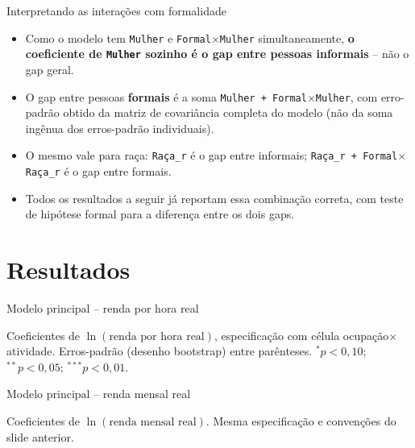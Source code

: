 \documentclass[aspectratio=169]{beamer}
\newcommand{\highlight}[1]{\textcolor{accentblue}{\textbf{#1}}}
\begin{document}
\begin{frame}{Interpretando as intera\c{c}\~oes com formalidade}
  \begin{itemize}
    \item Como o modelo tem \texttt{Mulher} e \texttt{Formal$\times$Mulher} simultaneamente, \highlight{o coeficiente de \texttt{Mulher} sozinho \'e o gap entre pessoas informais} -- n\~ao o gap geral.
    \item O gap entre pessoas \highlight{formais} \'e a soma \texttt{Mulher + Formal$\times$Mulher}, com erro-padr\~ao obtido da matriz de covari\^ancia completa do modelo (n\~ao da soma ingênua dos erros-padr\~ao individuais).
    \item O mesmo vale para ra\c{c}a: \texttt{Ra\c{c}a\_r} \'e o gap entre informais; \texttt{Ra\c{c}a\_r + Formal$\times$Ra\c{c}a\_r} \'e o gap entre formais.
    \item Todos os resultados a seguir j\'a reportam essa combina\c{c}\~ao correta, com teste de hip\'otese formal para a diferen\c{c}a entre os dois gaps.
  \end{itemize}
\end{frame}

\section{Resultados}

\begin{frame}{Modelo principal -- renda por hora real}
  \begin{center}
    \scriptsize
    \renewcommand{\arraystretch}{0.85}
    \setlength{\tabcolsep}{5pt}
    
  \end{center}
  {\scriptsize Coeficientes de $\ln(\text{renda por hora real})$, especifica\c{c}\~ao com c\'elula ocupa\c{c}\~ao$\times$atividade. Erros-padr\~ao (desenho bootstrap) entre par\^enteses. $^{*}p<0{,}10$; $^{**}p<0{,}05$; $^{***}p<0{,}01$.}
\end{frame}

\begin{frame}{Modelo principal -- renda mensal real}
  \begin{center}
    \scriptsize
    \renewcommand{\arraystretch}{0.85}
    \setlength{\tabcolsep}{5pt}
    
  \end{center}
  {\scriptsize Coeficientes de $\ln(\text{renda mensal real})$. Mesma especifica\c{c}\~ao e conven\c{c}\~oes do slide anterior.}
\end{frame}
\end{document}
